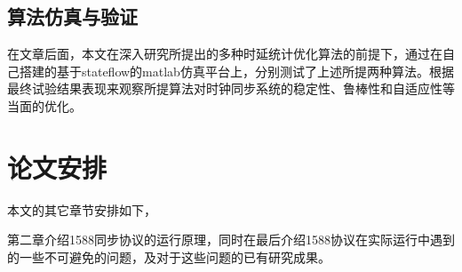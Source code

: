 \subsection{算法仿真与验证}
在文章后面，本文在深入研究所提出的多种时延统计优化算法的前提下，通过在自己搭建的基于stateflow的matlab仿真平台上，分别测试了上述所提两种算法。根据最终试验结果表现来观察所提算法对时钟同步系统的稳定性、鲁棒性和自适应性等当面的优化。


\section{论文安排}
本文的其它章节安排如下，

第二章介绍1588同步协议的运行原理，同时在最后介绍1588协议在实际运行中遇到的一些不可避免的问题，及对于这些问题的已有研究成果。


